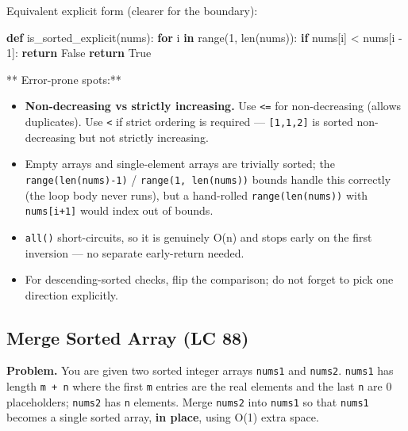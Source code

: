 \documentclass[11pt]{article}
\providecommand{\tightlist}{\setlength{\itemsep}{1pt}\setlength{\parskip}{0pt}}
\newenvironment{Shaded}{\begin{snugshade}}{\end{snugshade}}
\newcommand{\BuiltInTok}[1]{\textcolor[rgb]{0.50,0.55,0.55}{#1}}
\newcommand{\ControlFlowTok}[1]{\textcolor[rgb]{0.99,0.74,0.29}{\textbf{#1}}}
\newcommand{\DecValTok}[1]{\textcolor[rgb]{0.96,0.45,0.00}{#1}}
\newcommand{\KeywordTok}[1]{\textcolor[rgb]{0.81,0.81,0.76}{\textbf{#1}}}
\newcommand{\NormalTok}[1]{\textcolor[rgb]{0.81,0.81,0.76}{#1}}
\newcommand{\OperatorTok}[1]{\textcolor[rgb]{0.81,0.81,0.76}{#1}}
\newcommand{\VariableTok}[1]{\textcolor[rgb]{0.15,0.68,0.68}{#1}}
\begin{document}
Equivalent explicit form (clearer for the boundary):


\begin{Shaded}
\begin{Highlighting}[]
\KeywordTok{def}\NormalTok{ is\_sorted\_explicit(nums):}
    \ControlFlowTok{for}\NormalTok{ i }\KeywordTok{in} \BuiltInTok{range}\NormalTok{(}\DecValTok{1}\NormalTok{, }\BuiltInTok{len}\NormalTok{(nums)):}
        \ControlFlowTok{if}\NormalTok{ nums[i] }\OperatorTok{\textless{}}\NormalTok{ nums[i }\OperatorTok{{-}} \DecValTok{1}\NormalTok{]:}
            \ControlFlowTok{return} \VariableTok{False}
    \ControlFlowTok{return} \VariableTok{True}
\end{Highlighting}
\end{Shaded}

** Error-prone spots:**

\begin{itemize}
\tightlist
\item
  \textbf{Non-decreasing vs strictly increasing.} Use \texttt{\textless{}=} for non-decreasing (allows duplicates). Use \texttt{\textless{}} if strict ordering is required --- \texttt{{[}1,1,2{]}} is sorted non-decreasing but not strictly increasing.
\item
  Empty arrays and single-element arrays are trivially sorted; the \texttt{range(len(nums)-1)} / \texttt{range(1,\ len(nums))} bounds handle this correctly (the loop body never runs), but a hand-rolled \texttt{range(len(nums))} with \texttt{nums{[}i+1{]}} would index out of bounds.
\item
  \texttt{all()} short-circuits, so it is genuinely O(n) and stops early on the first inversion --- no separate early-return needed.
\item
  For descending-sorted checks, flip the comparison; do not forget to pick one direction explicitly.
\end{itemize}

\subsection{Merge Sorted Array (LC 88)}\label{merge-sorted-array-lc-88}

\textbf{Problem.} You are given two sorted integer arrays \texttt{nums1} and \texttt{nums2}. \texttt{nums1} has length \texttt{m\ +\ n} where the first \texttt{m} entries are the real elements and the last \texttt{n} are 0 placeholders; \texttt{nums2} has \texttt{n} elements. Merge \texttt{nums2} into \texttt{nums1} so that \texttt{nums1} becomes a single sorted array, \textbf{in place}, using O(1) extra space.
\end{document}
